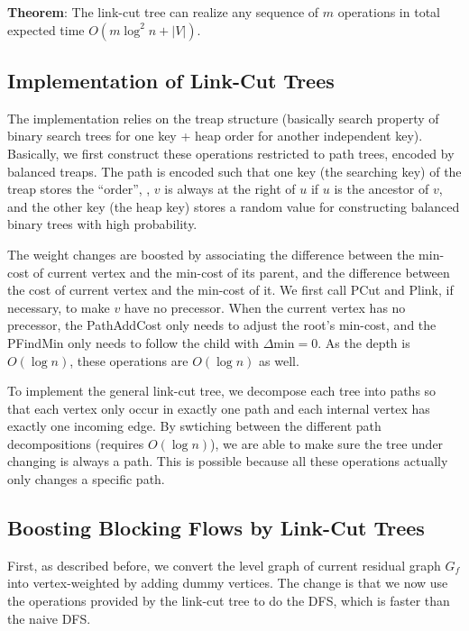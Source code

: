 \textbf{Theorem}: The link-cut tree can realize any sequence of $m$ operations in total expected time $O(m\log^2 n + |V|)$.

\subsection{Implementation of Link-Cut Trees}

The implementation relies on the treap structure (basically search property of binary search trees for one key + heap order for another independent key). Basically, we first construct these operations restricted to path trees, encoded by balanced treaps. The path is encoded such that one key (the searching key) of the treap stores the ``order'', \ie, $v$ is always at the right of $u$ if $u$ is the ancestor of $v$, and the other key (the heap key) stores a random value for constructing balanced binary trees with high probability.

The weight changes are boosted by associating the difference between the min-cost of current vertex and the min-cost of its parent, and the difference between the cost of current vertex and the min-cost of it. We first call PCut and Plink, if necessary, to make $v$ have no precessor. When the current vertex has no precessor, the PathAddCost only needs to adjust the root's min-cost, and the PFindMin only needs to follow the child with $\Delta \text{min}=0$. As the depth is $O(\log n)$, these operations are $O(\log n)$ as well.

To implement the general link-cut tree, we decompose each tree into paths so that each vertex only occur in exactly one path and each internal vertex has exactly one incoming edge. By swtiching between the different path decompositions (requires $O(\log n)$), we are able to make sure the tree under changing is always a path. This is possible because all these operations actually only changes a specific path.

\subsection{Boosting Blocking Flows by Link-Cut Trees}

First, as described before, we convert the level graph of current residual graph $G_f$ into vertex-weighted by adding dummy vertices. The change is that we now use the operations provided by the link-cut tree to do the DFS, which is faster than the naive DFS.